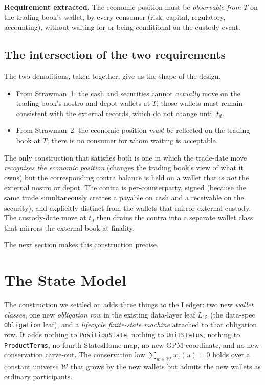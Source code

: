 \documentclass[11pt,a4paper]{article}
\begin{document}
\textbf{Requirement extracted.} The economic position must be \emph{observable from $T$} on the trading book's wallet, by every consumer (risk, capital, regulatory, accounting), without waiting for or being conditional on the custody event.

\subsection{The intersection of the two requirements}

The two demolitions, taken together, give us the shape of the design.

\begin{itemize}[nosep]
\item From Strawman~1: the cash and securities cannot \emph{actually} move on the trading book's nostro and depot wallets at $T$; those wallets must remain consistent with the external records, which do not change until $t_d$.
\item From Strawman~2: the economic position \emph{must} be reflected on the trading book at $T$; there is no consumer for whom waiting is acceptable.
\end{itemize}

The only construction that satisfies both is one in which the trade-date move \emph{recognises the economic position} (changes the trading book's view of what it owns) but the corresponding contra balance is held on a wallet that is \emph{not} the external nostro or depot. The contra is per-counterparty, signed (because the same trade simultaneously creates a payable on cash and a receivable on the security), and explicitly distinct from the wallets that mirror external custody. The custody-date move at $t_d$ then drains the contra into a separate wallet class that mirrors the external book at finality.

The next section makes this construction precise.

\clearpage
\section{The State Model}
\label{sec:state-model}

The construction we settled on adds three things to the Ledger: two new \emph{wallet classes}, one new \emph{obligation row} in the existing data-layer leaf $L_{15}$ (the data-spec \texttt{Obligation} leaf), and a \emph{lifecycle finite-state machine} attached to that obligation row. It adds nothing to \texttt{PositionState}, nothing to \texttt{UnitStatus}, nothing to \texttt{ProductTerms}, no fourth StatesHome map, no new GPM coordinate, and no new conservation carve-out. The conservation law $\sum_{w \in \mathcal{W}} w_t(u) = 0$ holds over a constant universe $\mathcal{W}$ that grows by the new wallets but admits the new wallets as ordinary participants.
\end{document}
